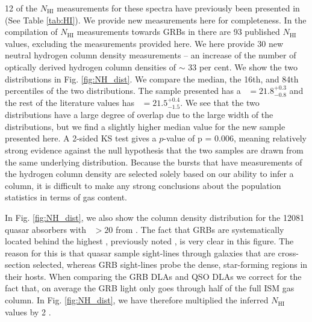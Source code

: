 \documentclass[longauth]{aa}    %
\begin{document}
12 of the $N_{\mathrm{HI}}$ measurements for these spectra have previously been
presented in \citet{Cucchiara2015} (See Table \ref{tab:HI}). We provide new
measurements here for completeness. In the compilation of $N_{\mathrm{HI}}$
measurements towards GRBs in \citet{Tanvir2017} there are 93 published
$N_{\mathrm{HI}}$ values, excluding the measurements provided here. We here
provide 30 new neutral hydrogen column density measurements -- an increase of
the number of optically derived hydrogen column densities of $\sim$ 33 per cent.
We show the two distributions in  Fig. \ref{fig:NH_dist}. We compare the median,
the 16th, and 84th percentiles of the two distributions. The sample presented
has a \nh~$= 21.8_{-0.8}^{+0.3}$ and the rest of the literature values has
\nh~$= 21.5_{-1.5}^{+0.4}$. We see that the two distributions have a large
degree of overlap due to the large width of the distributions, but we find a
slightly higher median value for the new sample presented here. A 2-sided KS
test gives a $p$-value of p = 0.006, meaning relatively strong evidence against the
null hypothesis that the two samples are drawn from the same underlying distribution.
Because the bursts that have measurements of the hydrogen column density are
selected solely based on our ability to infer a column, it is difficult to make
any strong conclusions about the population statistics in terms of gas content.

In Fig. \ref{fig:NH_dist}, we also show the column density distribution for the
12081 quasar absorbers with \nh~$> 20$ from \citet{Noterdaeme2012b}. The fact
that GRBs are systematically located behind the highest \nh, previously noted
\citep[e.g.][]{Prochaska2007, Fynbo2009}, is very clear in this figure. The
reason for this is that quasar sample sight-lines through galaxies that are
cross-section selected, whereas GRB sight-lines probe the dense, star-forming
regions in their hosts. When comparing the GRB DLAs and QSO DLAs we correct for
the fact that, on average the GRB light only goes through half of the full ISM
gas column. In Fig. \ref{fig:NH_dist}, we have therefore multiplied the inferred
$N_{\mathrm{HI}}$ values by 2 \citep{Prochaska2008}.
\end{document}
